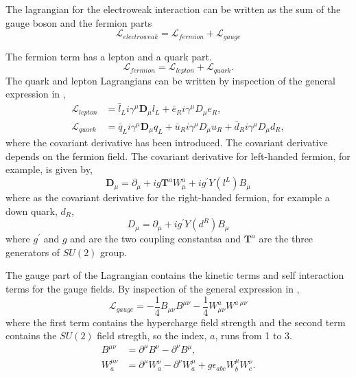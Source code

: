 The lagrangian for the electroweak interaction can be written as the sum of the
gauge boson and the fermion parts
\begin{equation}
\mathcal{L}_{electroweak} = 
\mathcal{L}_{fermion}
+ \mathcal{L}_{gauge}
\end{equation}


The fermion term has a lepton and a quark part.
\begin{equation}
\mathcal{L}_{fermion} =
 \mathcal{L}_{lepton}
+ \mathcal{L}_{quark}.
\end{equation}
The quark and lepton Lagrangians can be written by inspection of the general
expression in ,
\begin{align*}
\mathcal{L}_{lepton} &= 
\bar{l}_{L} i \gamma^{\mu} \mathbf{D}_{\mu} l_{L} +
\bar{e}_{R} i \gamma^{\mu} D_{\mu} e_{R}, \\
\mathcal{L}_{quark} &= 
\bar{q}_{L} i \gamma^{\mu} \mathbf{D}_{\mu} q_{L} +
\bar{u}_{R} i \gamma^{\mu} D_{\mu} u_{R} +
\bar{d}_{R} i \gamma^{\mu} D_{\mu} d_{R},
\end{align*}
where the covariant derivative has been introduced.
The covariant derivative depends on the fermion field. The covariant derivative
for left-handed fermion, for example, is given by,
\begin{equation}
\mathbf{D}_\mu 
= \partial_\mu 
+ ig\mathbf{T}^{a}W_{\mu}^{a}
+ ig^{\prime}Y(l^{L})B_{\mu}
\end{equation}
where as the covariant derivative for the right-handed fermion, for example a
down quark, $d_R$,
\begin{equation}
D_\mu = \partial_\mu + ig^{\prime}Y(d^{R})B_{\mu}
\end{equation}
where $g^\prime$ and $g$ and are the two coupling constantsa and
$\mathbf{T}^{a}$ are the three generators of $SU(2)$ group.

The gauge part of the Lagrangian contains the kinetic terms and self interaction
terms for the gauge fields. By inspection of the general expression in
,
\begin{equation}
\mathcal{L}_{gauge} = 
- \frac{1}{4} B_{\mu\nu} B^{\mu\nu}
- \frac{1}{4} W^{a}_{\mu\nu} W^{a~\mu\nu}
\end{equation}
where the first term contains the hypercharge field strength and the second term 
contains the $SU(2)$ field stregth, so the index, $a$, runs from 1 to 3.
\begin{align*}
B^{\mu\nu}     &= \partial^{\mu} B^{\nu} - \partial^{\nu} B^{\mu},\\
W_{a}^{\mu\nu} &= \partial^{\mu} W_{a}^{\nu} - \partial^{\nu} W_{a}^{\mu} 
                + g \epsilon_{abc} W_{b}^{\mu} W_{c}^{\nu}.
\end{align*}

